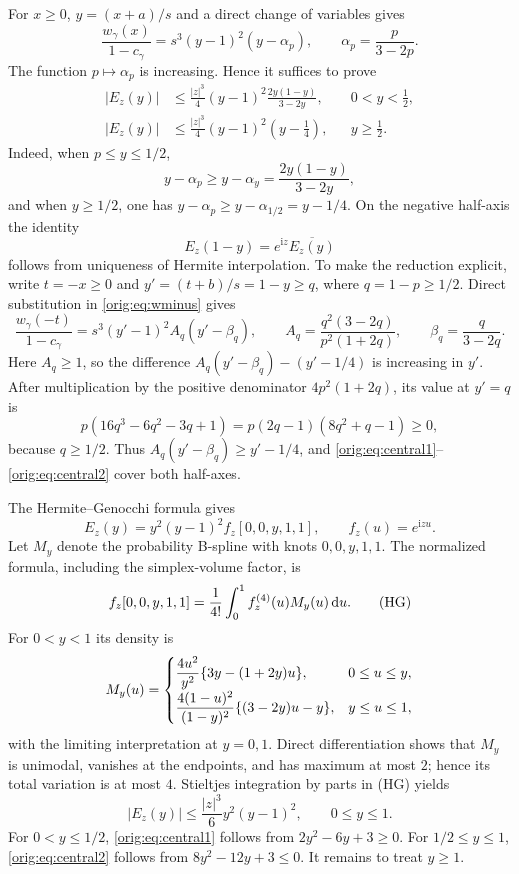 \documentclass[11pt,a4paper]{article}
\numberwithin{equation}{section}
\theoremstyle{definition}
\theoremstyle{remark}
\newcommand{\ii}{\mathrm i}
\newcommand{\dd}{\,\mathrm d}
\begin{document}
For $x\ge0$, $y=(x+a)/s$ and a direct change of variables gives
\[
 \frac{w_\gamma(x)}{1-c_\gamma}
 =s^3(y-1)^2(y-\alpha_p),
 \qquad \alpha_p=\frac{p}{3-2p}.
\]
The function $p\mapsto\alpha_p$ is increasing.  Hence it suffices to
prove
\begin{align}
 |E_z(y)|&\le\frac{|z|^3}{4}(y-1)^2
 \frac{2y(1-y)}{3-2y},&&0<y<\tfrac12,\label{orig:eq:central1}\\
 |E_z(y)|&\le\frac{|z|^3}{4}(y-1)^2(y-\tfrac14),&&y\ge\tfrac12.
 \label{orig:eq:central2}
\end{align}
Indeed, when $p\le y\le1/2$,
\[
 y-\alpha_p\ge y-\alpha_y=\frac{2y(1-y)}{3-2y},
\]
and when $y\ge1/2$, one has
$y-\alpha_p\ge y-\alpha_{1/2}=y-1/4$.
On the negative half-axis the identity
\[
 E_z(1-y)=e^{\ii z}\overline{E_z(y)}
\]
follows from uniqueness of Hermite interpolation.  To make the reduction
explicit, write $t=-x\ge0$ and
$y'=(t+b)/s=1-y\ge q$, where $q=1-p\ge1/2$.  Direct substitution in
\eqref{orig:eq:wminus} gives
\[
 \frac{w_\gamma(-t)}{1-c_\gamma}
 =s^3(y'-1)^2 A_q(y'-\beta_q),\qquad
 A_q=\frac{q^2(3-2q)}{p^2(1+2q)},\qquad
 \beta_q=\frac{q}{3-2q}.
\]
Here $A_q\ge1$, so the difference
$A_q(y'-\beta_q)-(y'-1/4)$ is increasing in $y'$.  After multiplication by
the positive denominator $4p^2(1+2q)$, its value at $y'=q$ is
\[
 p(16q^3-6q^2-3q+1)
 =p(2q-1)(8q^2+q-1)\ge0,
\]
because $q\ge1/2$.  Thus
$A_q(y'-\beta_q)\ge y'-1/4$, and
\eqref{orig:eq:central1}--\eqref{orig:eq:central2} cover both half-axes.

The Hermite--Genocchi formula gives
\[
 E_z(y)=y^2(y-1)^2 f_z[0,0,y,1,1],
 \qquad f_z(u)=e^{\ii zu}.
\]
Let $M_y$ denote the probability B-spline with knots $0,0,y,1,1$.  The
normalized formula, including the simplex-volume factor, is
\[
 f_z[0,0,y,1,1]
 ={1\over4!}\int_0^1 f_z^{(4)}(u)M_y(u)\dd u.             \tag{HG}
\]
For $0<y<1$ its density is
\[
 M_y(u)=
 \begin{cases}
 \displaystyle {4u^2\over y^2}\{3y-(1+2y)u\},
       &0\le u\le y,\\[2mm]
 \displaystyle {4(1-u)^2\over(1-y)^2}\{(3-2y)u-y\},
       &y\le u\le1,
 \end{cases}
\]
with the limiting interpretation at $y=0,1$.  Direct differentiation shows
that $M_y$ is unimodal, vanishes at the endpoints, and has maximum at most
$2$; hence its total variation is at most $4$.  Stieltjes integration by
parts in (HG) yields
\begin{equation}\label{orig:eq:hermitecubic}
 |E_z(y)|\le\frac{|z|^3}{6}y^2(y-1)^2,\qquad0\le y\le1.
\end{equation}
For $0<y\le1/2$, \eqref{orig:eq:central1} follows from
$2y^2-6y+3\ge0$.  For $1/2\le y\le1$, \eqref{orig:eq:central2} follows from
$8y^2-12y+3\le0$.  It remains to treat $y\ge1$.
\end{document}

